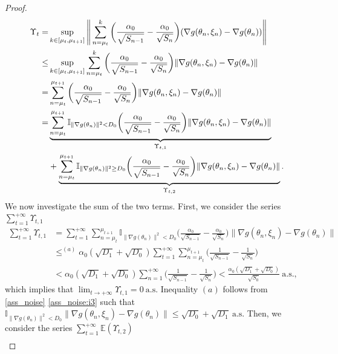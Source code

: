 \documentclass[standalone]{article}
\newcommand{\I}{\mathbb{I}}
\begin{document}
\begin{proof}
\begin{align}
\Upsilon_{t}=&\sup_{k\in[\mu_{t}, \mu_{t+1}]}\Bigg\|\sum_{n=\mu_{t}}^{k}\bigg(\frac{\alpha_{0}}{\sqrt{S_{n-1}}}-\frac{\alpha_{0}}{\sqrt{S_{n}}}\bigg)(\nabla g(\theta_{n},\xi_{n})-\nabla g(\theta_{n}))\Bigg\|\notag\\\le& \sup_{k\in[\mu_{t}, \mu_{t+1}]}\sum_{n=\mu_{t}}^{k}\bigg(\frac{\alpha_{0}}{\sqrt{S_{n-1}}}-\frac{\alpha_{0}}{\sqrt{S_{n}}}\bigg)\|\nabla g(\theta_{n},\xi_{n})-\nabla g(\theta_{n})\|\notag\\=&\sum_{n=\mu_{t}}^{\mu_{t+1}}\bigg(\frac{\alpha_{0}}{\sqrt{S_{n-1}}}-\frac{\alpha_{0}}{\sqrt{S_{n}}}\bigg)\|\nabla g(\theta_{n},\xi_{n})-\nabla g(\theta_{n})\| \notag\\=&\underbrace{\sum_{n=\mu_{t}}^{\mu_{t+1}}\I_{\|\nabla g(\theta_{n})\|^{2}<D_{0}}\bigg(\frac{\alpha_{0}}{\sqrt{S_{n-1}}}-\frac{\alpha_{0}}{\sqrt{S_{n}}}\bigg)\|\nabla g(\theta_{n},\xi_{n})-\nabla g(\theta_{n})\|}_{\Upsilon_{t,1}}\notag\\&+\underbrace{\sum_{n=\mu_{t}}^{\mu_{t+1}}\I_{\|\nabla g(\theta_{n})\|^{2}\ge D_{0}}\bigg(\frac{\alpha_{0}}{\sqrt{S_{n-1}}}-\frac{\alpha_{0}}{\sqrt{S_{n}}}\bigg)\|\nabla g(\theta_{n},\xi_{n})-\nabla g(\theta_{n})\|}_{\Upsilon_{t,2}}.
\end{align}
We now investigate the sum of the two terms. First, we consider the series \(\sum_{t=1}^{+\infty}\Upsilon_{t,1}\)
\begin{align*}
\sum_{t=1}^{+\infty}\Upsilon_{t,1}&=\sum_{t=1}^{+\infty}\sum_{n=\mu_{t}}^{\mu_{t+1}}\I_{\|\nabla g(\theta_{n})\|^{2}<D_{0}}\bigg(\frac{\alpha_{0}}{\sqrt{S_{n-1}}}-\frac{\alpha_{0}}{\sqrt{S_{n}}}\bigg)\|\nabla g(\theta_{n},\xi_{n})-\nabla g(\theta_{n})\|\\&\mathop{\le}^{(a)}\alpha_{0}(\sqrt{D_{1}}+\sqrt{D_{0}}) \sum_{t=1}^{+\infty}\sum_{n=\mu_{t}}^{\mu_{t+1}}\bigg(\frac{1}{\sqrt{S_{n-1}}}-\frac{1}{\sqrt{S_{n}}}\bigg)\\&<\alpha_{0}(\sqrt{D_{1}}+\sqrt{D_{0}})\sum_{n=1}^{+\infty}\bigg(\frac{1}{\sqrt{S_{n-1}}}-\frac{1}{\sqrt{S_{n}}}\bigg)<\frac{\alpha_{0}(\sqrt{D_{1}}+\sqrt{D_{0}})}{\sqrt{S_{0}}}\ \text{a.s.}, 
\end{align*}
which implies that $
\lim_{t\rightarrow+\infty}\Upsilon_{t,1}=0\ \text{a.s.} $
Inequality $(a)$ follows from \cref{ass_noise} \cref{ass_noise:i3} such that $\I_{\|\nabla g(\theta_{n})\|^{2}<D_{0}}\|\nabla g(\theta_{n},\xi_{n})-\nabla g(\theta_{n})\|\le \sqrt{D_{0}}+\sqrt{D_{1}}\ \text{a.s.}$ Then, we consider the series \(\sum_{t=1}^{+\infty}\mathbb{E}(\Upsilon_{t,2})\)
\begin{align*}

\end{align*}
\end{proof}
\end{document}
